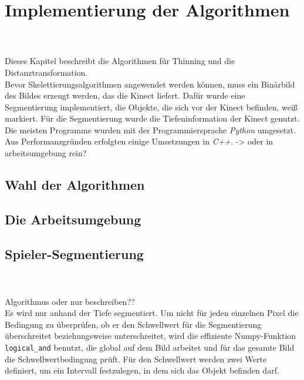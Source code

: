 \chapter{Implementierung der Algorithmen}
\\\\
Dieses Kapitel beschreibt die Algorithmen für Thinning und die Distanztransformation.\\
Bevor Skelettierungsalgorithmen angewendet werden können, muss ein Binärbild des Bildes erzeugt werden, 
das die Kinect liefert. Dafür wurde eine Segmentierung implementiert, die Objekte, die sich vor der
Kinect befinden, weiß markiert. Für die Segmentierung wurde die Tiefeninformation der Kinect genutzt.\\
Die meisten Programme wurden mit der Programmiersprache \emph{Python} umgesetzt. Aus Performanzgründen 
erfolgten einige Umsetzungen in \emph{C++}. -> oder in arbeitsumgebung rein?\\
\begin{algorithm}
\begin{algorithmic}[1]
\EndWhile
\EndProcedure
\end{algorithmic}
\end{algorithm}

\section{Wahl der Algorithmen}
\section{Die Arbeitsumgebung}
\section{Spieler-Segmentierung}
\\\\
Algorithmus oder nur beschreiben??\\
Es wird nur anhand der Tiefe segmentiert. Um nicht für jeden einzelnen Pixel die Bedingung zu überprüfen, ob er den Schwellwert für die Segmentierung überschreitet beziehungsweise unterschreitet, wird die effiziente Numpy-Funktion \texttt{logical\_and} benutzt, die global auf dem Bild arbeitet und für das gesamte Bild die Schwellwertbedingung prüft. Für den Schwellwert werden zwei 
Werte definiert, um ein Intervall festzulegen, in dem sich das Objekt befinden darf. 
